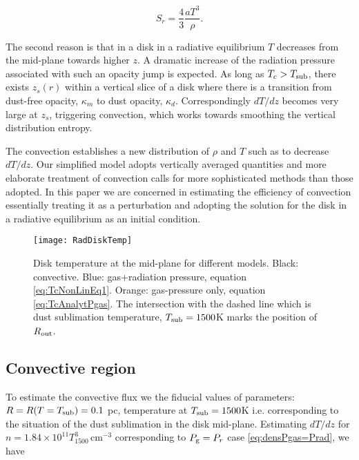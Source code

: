 \documentclass[12pt,english,preprint]{aastex}
\newcommand{\su}[2]{#1_{\rm #2}}
\newcommand{\Rout}{\su{R}{out}}
\newcommand{\Tsub}{ \su{T}{sub} }
\begin{document}
\begin{equation}
S_{r}=\frac{4}{3}\frac{aT^{3}}{\rho}\mbox{.}\label{eq:EntropyRad}
\end{equation}

The second reason\emph{ }is that in a disk in a radiative equilibrium 
$T$ decreases from the mid-plane towards higher $z$.
A dramatic increase of the radiation pressure associated
with such an opacity jump is expected. 
As long as $T_{c}>T_{{\rm sub}}$,
there exists $z_{s}(r)$ within a vertical slice of a disk where there
is a transition from dust-free opacity, $\kappa_{m}$ to dust opacity,
$\kappa_{d}$. Correspondingly $dT/dz$ becomes very large at $z_{s}$, 
triggering convection, which works towards smoothing the vertical distribution 
entropy.

The convection establishes a new distribution of $\rho$ and $T$
such as to decrease $dT/dz$. 
Our simplified model adopts vertically averaged
quantities and
more elaborate treatment of convection calls for more
sophisticated methods than those adopted. In this paper we are concerned
in estimating the efficiency of convection essentially treating it
as a perturbation and adopting the solution for the disk in a radiative equilibrium
as an initial condition.

\begin{figure}
\texttt{[image: RadDiskTemp]} 
\caption{
Disk temperature at the mid-plane for different models.  
Black: convective.  Blue: gas+radiation pressure, 
equation \eqref{eq:TcNonLinEq1}.
Orange: gas-pressure only,
equation \eqref{eq:TcAnalytPgas}. 
The intersection with the dashed line which is 
dust sublimation temperature, $T_{{\rm sub}}=1500$K marks the 
position of $\Rout$.}
\label{RadDiskTempPlot} 
\end{figure}


\subsection{Convective region}
To estimate the convective flux we the fiducial values of parameters:
${\displaystyle R=R(T= \Tsub)= 0.1}$ pc,
temperature at $T_{{\rm sub}}=1500$K i.e. corresponding to the
situation of the dust sublimation in the disk mid-plane. 
Estimating $dT/dz$ for
$n = 1.84\times10^{11}T_{1500}^{3}\,\text{cm}^{-3}$
corresponding to $P_{{\rm g}}=P_r$ case \eqref{eq:densPgas=Prad}, we have
 
\end{document}
